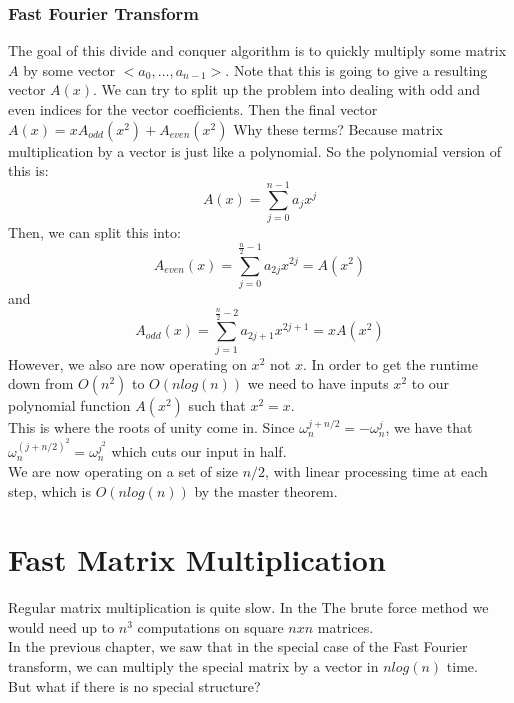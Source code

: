 \documentclass[12pt]{article}
\theoremstyle{definition}
\begin{document}
\subsubsection{Fast Fourier Transform}
The goal of this divide and conquer algorithm is to quickly multiply some matrix $A$ by some vector $<a_0,\dots,a_{n-1}>$. Note that this is going to give a resulting vector $A(x)$. We can try to split up the problem into dealing with odd and even indices for the vector coefficients. Then the final vector $A(x) = xA_{odd}(x^2) + A_{even}(x^2)$ Why these terms? Because matrix multiplication by a vector is just like a polynomial. So the polynomial version of this is:
$$ A(x) = \sum_{j=0}^{n-1}a_jx^j$$
Then, we can split this into:
$$ A_{even}(x) = \sum_{j=0}^{\frac{n}{2} -1} a_{2j}x^{2j} = A(x^2)$$
and
$$ A_{odd}(x) = \sum_{j=1}^{\frac{n}{2} -2}a_{2j+1}x^{2j+1} = xA(x^2)$$
 However, we also are now operating on $x^2$ not $x$. In order to get the runtime down from $O(n^2)$ to $O(nlog(n))$ we need to have inputs $x^2$ to our polynomial function $A(x^2)$ such that $x^2 = x$.
\\ \linebreak
This is where the roots of unity come in. Since $\omega_n^{j + n/2} = -\omega_n^{j}$, we have that $\omega_n^{(j + n/2)^2} = \omega_n^{j^2}$ which cuts our input in half.
\\ \linebreak
We are now operating on a set of size $n/2$, with linear processing time at each step, which is $O(nlog(n))$ by the master theorem.

\section{Fast Matrix Multiplication}
Regular matrix multiplication is quite slow. In the The brute force method we would need up to $n^3$ computations on square $nxn$ matrices.
\\ \linebreak
In the previous chapter, we saw that in the special case of the Fast Fourier transform, we can multiply the special matrix by a vector in $nlog(n)$ time. 
\\ \linebreak
But what if there is no special structure?
\end{document}
